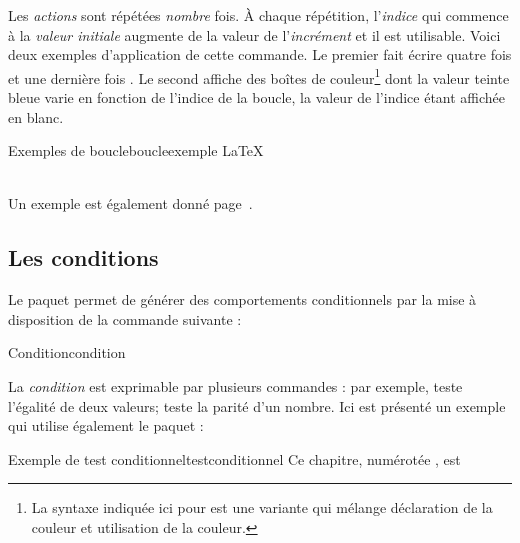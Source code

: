 Les \emph{actions} sont répétées \emph{nombre} fois. \`{A} chaque répétition, l'\emph{indice} qui commence à la \emph{valeur initiale} augmente de la valeur de l'\emph{incrément} et il est utilisable. Voici deux exemples d'application de cette commande. Le premier fait écrire quatre fois  et une dernière fois . Le second affiche des boîtes de couleur\footnote{La syntaxe indiquée ici pour  est une variante qui mélange déclaration de la couleur et utilisation de la couleur.} dont la valeur teinte bleue varie en fonction de l'indice de la boucle, la valeur de l'indice étant affichée en blanc.

\begin{codedouble}{Exemples de boucle}{boucleexemple}
\LaTeX \\ \\
\end{codedouble}

Un exemple est également donné page~\pageref{famillecourbe}.

\subsection{Les conditions}

Le paquet  permet de générer des comportements conditionnels par la mise à disposition de la commande suivante :

\begin{codesimple}{Condition}{condition}
\end{codesimple}

La \textit{condition} est exprimable par plusieurs commandes : par exemple, teste l'égalité de deux valeurs;  teste la parité d'un nombre. Ici est présenté un exemple qui utilise également le paquet :

\begin{codedouble}{Exemple de test conditionnel}{testconditionnel}
Ce chapitre, numérotée \thechapter, est  \\
\end{codedouble}


